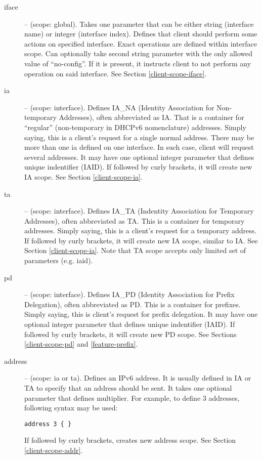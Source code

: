 \begin{description}
\item[iface] -- (scope: global). Takes one parameter that can be
either string (interface name) or integer (interface index). Defines
that client should perform some actions on specified interface. Exact
operations are defined within interface scope. Can optionally take
second string parameter with the only allowed value of
``no-config''. If it is present, it instructs client to not perform
any operation on said interface. See Section \ref{client-scope-iface}.

\item[ia] -- (scope: interface). Defines IA\_NA (Identity Association for
Non-temporary Addresses), often abbreviated as IA. That is a
container for ``regular'' (non-temporary in DHCPv6 nomenclature)
addresses. Simply saying, this is a client's request for a single normal
address. There may be more than one ia defined on one interface. In
such case, client will request several addresses. It may have one
optional integer parameter that defines unique indentifier (IAID). If
followed by curly brackets, it will create new IA scope. See
Section \ref{client-scope-ia}.

\item[ta] -- (scope: interface). Defines IA\_TA (Indentity Association
for Temporary Addresses), often abbreviated as TA. This is a
container for temporary addresses. Simply saying, this is a client's
request for a temporary address. If followed by curly brackets, it
will create new IA scope, similar to IA. See
Section \ref{client-scope-ia}. Note that TA scope accepts only limited set of
parameters (e.g. iaid).

\item[pd] -- (scope: interface). Defines IA\_PD (Identity Association
for Prefix Delegation), often abbreviated as PD. This is a container
for prefixes. Simply saying, this is client's request for prefix
delegation. It may have one optional integer parameter that defines
unique indentifier (IAID). If followed by curly brackets, it will
create new PD scope. See Sections \ref{client-scope-pd}
and \ref{feature-prefix}.

\item[address] -- (scope: ia or ta). Defines an IPv6 address. It is
usually defined in IA or TA to specify that an address should be sent. It
takes one optional parameter that defines multiplier. For example, to
define 3 addresses, following syntax may be used:
\begin{lstlisting}
address 3 { }
\end{lstlisting}
If followed by curly brackets, creates new address scope. See
Section \ref{client-scope-addr}.


\end{description}
